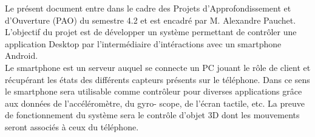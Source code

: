 
Le présent document entre dans le cadre des Projets d’Approfondissement
et d’Ouverture (PAO) du semestre 4.2 et est encadré par M. Alexandre Pauchet.
L'objectif du projet est de développer un système permettant de contrôler une application Desktop par l'intermédiaire d'intéractions avec un smartphone Android. \\
Le smartphone est un serveur auquel se connecte un PC jouant le rôle de client et récupérant les états des différents capteurs présents sur le téléphone. Dans ce sens le smartphone sera utilisable comme contrôleur
pour diverses applications grâce aux données de l’accéléromètre, du gyro-
scope, de l’écran tactile, etc.
La preuve de fonctionnement du système sera le contrôle d'objet 3D dont les mouvements seront associés à ceux du téléphone.